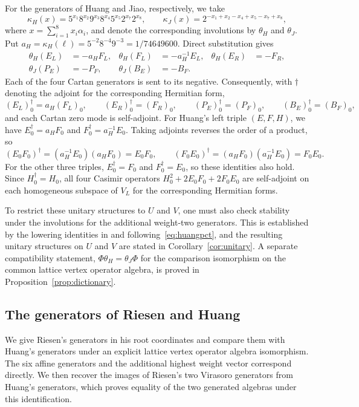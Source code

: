 \documentclass[11pt,reqno]{amsart}
\theoremstyle{definition}\newtheorem{definition}[theorem]{Definition}
\theoremstyle{remark}\newtheorem{remark}[theorem]{Remark}
\numberwithin{equation}{section}
\begin{document}
For the generators of Huang and Jiao, respectively, we take
\[
 \kappa_H(x)=5^{x_1}8^{x_2}9^{x_3}8^{x_4}5^{x_5}2^{x_7}2^{x_8},
 \qquad
 \kappa_J(x)=2^{-x_1+x_2-x_4+x_5-x_7+x_8},
\]
where $x=\sum_{i=1}^8x_i\alpha_i$, and denote the corresponding involutions by $\theta_H$ and $\theta_J$. Put $a_H=\kappa_H(\ell)=5^{-2}8^{-4}9^{-3}=1/74649600$. Direct substitution gives
\[
 \begin{aligned}
 \theta_H(E_L)&=-a_HF_L,&\theta_H(F_L)&=-a_H^{-1}E_L,&
 \theta_H(E_R)&=-F_R,\\
 \theta_J(P_E)&=-P_F,&\theta_J(B_E)&=-B_F.
 \end{aligned}
\]
Each of the four Cartan generators is sent to its negative. Consequently, with $\dagger$ denoting the adjoint for the corresponding Hermitian form,
\[
 (E_L)_0^\dagger=a_H(F_L)_0,\qquad
 (E_R)_0^\dagger=(F_R)_0,\qquad
 (P_E)_0^\dagger=(P_F)_0,\qquad
 (B_E)_0^\dagger=(B_F)_0,
\]
and each Cartan zero mode is self-adjoint. For Huang's left triple $(E,F,H)$, we have $E_0^\dagger=a_HF_0$ and $F_0^\dagger=a_H^{-1}E_0$. Taking adjoints reverses the order of a product, so
\[
 (E_0F_0)^\dagger=(a_H^{-1}E_0)(a_HF_0)=E_0F_0,
 \qquad
 (F_0E_0)^\dagger=(a_HF_0)(a_H^{-1}E_0)=F_0E_0.
\]
For the other three triples, $E_0^\dagger=F_0$ and $F_0^\dagger=E_0$, so these identities also hold. Since $H_0^\dagger=H_0$, all four Casimir operators $H_0^2+2E_0F_0+2F_0E_0$ are self-adjoint on each homogeneous subspace of $V_L$ for the corresponding Hermitian forms.

To restrict these unitary structures to $U$ and $V$, one must also check stability under the involutions for the additional weight-two generators. This is established by the lowering identities in and following~\eqref{eq:huangpct}, and the resulting unitary structures on $U$ and $V$ are stated in Corollary~\ref{cor:unitary}. A separate compatibility statement, $\Phi\theta_H=\theta_J\Phi$ for the comparison isomorphism on the common lattice vertex operator algebra, is proved in Proposition~\ref{prop:dictionary}.


\subsection{The generators of Riesen and Huang}\label{sub:Riesen}
We give Riesen's generators in his root coordinates and compare them with Huang's generators under an explicit lattice vertex operator algebra isomorphism. The six affine generators and the additional highest weight vector correspond directly. We then recover the images of Riesen's two Virasoro generators from Huang's generators, which proves equality of the two generated algebras under this identification.
\end{document}
